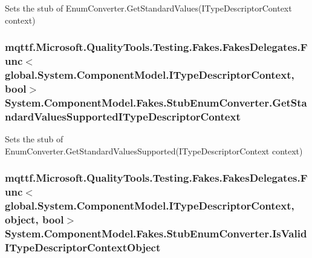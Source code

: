 Sets the stub of Enum\-Converter.\-Get\-Standard\-Values(\-I\-Type\-Descriptor\-Context context)

\hypertarget{class_system_1_1_component_model_1_1_fakes_1_1_stub_enum_converter_a2d42dc6be0ee956689880c1083137e5e}{
\subsubsection[{Get\-Standard\-Values\-Supported\-I\-Type\-Descriptor\-Context}]{\setlength{\rightskip}{0pt plus 5cm}mqttf.\-Microsoft.\-Quality\-Tools.\-Testing.\-Fakes.\-Fakes\-Delegates.\-Func$<$global.\-System.\-Component\-Model.\-I\-Type\-Descriptor\-Context, bool$>$ System.\-Component\-Model.\-Fakes.\-Stub\-Enum\-Converter.\-Get\-Standard\-Values\-Supported\-I\-Type\-Descriptor\-Context}}\label{class_system_1_1_component_model_1_1_fakes_1_1_stub_enum_converter_a2d42dc6be0ee956689880c1083137e5e}


Sets the stub of Enum\-Converter.\-Get\-Standard\-Values\-Supported(\-I\-Type\-Descriptor\-Context context)

\hypertarget{class_system_1_1_component_model_1_1_fakes_1_1_stub_enum_converter_ad38f417d3029deeff0758980550c6e64}{
\subsubsection[{Is\-Valid\-I\-Type\-Descriptor\-Context\-Object}]{\setlength{\rightskip}{0pt plus 5cm}mqttf.\-Microsoft.\-Quality\-Tools.\-Testing.\-Fakes.\-Fakes\-Delegates.\-Func$<$global.\-System.\-Component\-Model.\-I\-Type\-Descriptor\-Context, object, bool$>$ System.\-Component\-Model.\-Fakes.\-Stub\-Enum\-Converter.\-Is\-Valid\-I\-Type\-Descriptor\-Context\-Object}}\label{class_system_1_1_component_model_1_1_fakes_1_1_stub_enum_converter_ad38f417d3029deeff0758980550c6e64}


